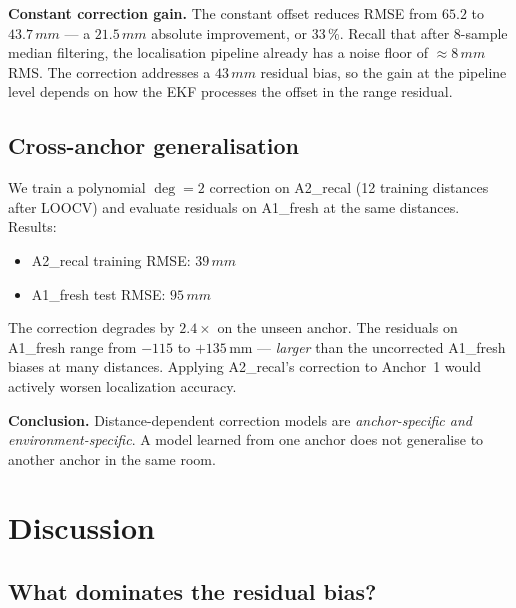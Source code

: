 \documentclass[10pt,a4paper,twocolumn]{article}
\begin{document}
\textbf{Constant correction gain.}  The constant offset reduces RMSE from
$65.2$ to $43.7\,mm$ --- a $21.5\,mm$ absolute improvement, or
33\,\%.  Recall that after 8-sample median filtering, the localisation pipeline
already has a noise floor of $\approx 8\,mm$\,RMS.  The correction
addresses a $43\,mm$ residual bias, so the gain at the pipeline level
depends on how the EKF processes the offset in the range residual.

\subsection{Cross-anchor generalisation}

We train a polynomial $\deg = 2$ correction on A2\_recal (12 training
distances after LOOCV) and evaluate residuals on A1\_fresh at the same
distances.  Results:
\begin{itemize}[noitemsep]
\item A2\_recal training RMSE: $39\,mm$
\item A1\_fresh test RMSE: $95\,mm$
\end{itemize}

The correction degrades by $2.4\times$ on the unseen anchor.  The residuals on
A1\_fresh range from $-115$ to $+135$\,mm --- \emph{larger} than the
uncorrected A1\_fresh biases at many distances.  Applying A2\_recal's
correction to Anchor~1 would actively worsen localization accuracy.

\textbf{Conclusion.}  Distance-dependent correction models are
\emph{anchor-specific and environment-specific}.  A model learned from one
anchor does not generalise to another anchor in the same room.

\section{Discussion}

\subsection{What dominates the residual bias?}
\end{document}
